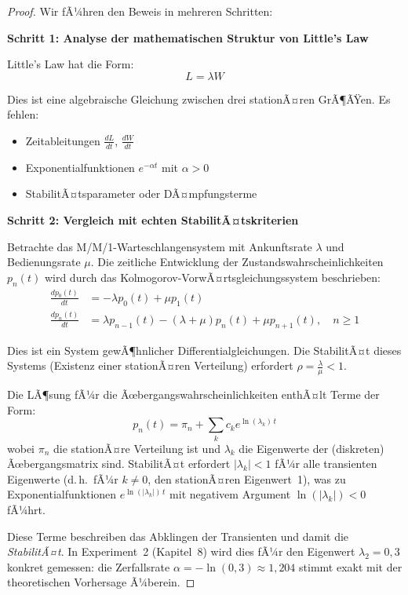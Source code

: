 ﻿\documentclass[a4paper,12pt]{scrreprt}
\theoremstyle{definition}
\begin{document}
\begin{proof}
	Wir fÃ¼hren den Beweis in mehreren Schritten:
	
	\textbf{Schritt 1: Analyse der mathematischen Struktur von Little's Law}
	
	Little's Law hat die Form:
	\begin{equation}
		L = \lambda W
	\end{equation}
	
	Dies ist eine algebraische Gleichung zwischen drei stationÃ¤ren GrÃ¶ÃŸen. Es fehlen:
	\begin{itemize}
		\item[-] Zeitableitungen $\frac{dL}{dt}$, $\frac{dW}{dt}$
		\item[-] Exponentialfunktionen $e^{-\alpha t}$ mit $\alpha > 0$
		\item[-] StabilitÃ¤tsparameter oder DÃ¤mpfungsterme
	\end{itemize}
	
	\textbf{Schritt 2: Vergleich mit echten StabilitÃ¤tskriterien}
	
	Betrachte das M/M/1-Warteschlangensystem mit Ankunftsrate $\lambda$ und Bedienungsrate $\mu$. Die zeitliche Entwicklung der Zustandswahrscheinlichkeiten $p_n(t)$ wird durch das Kolmogorov-VorwÃ¤rtsgleichungssystem beschrieben:
	\begin{align}
		\frac{dp_0(t)}{dt} &= -\lambda p_0(t) + \mu p_1(t) \\
		\frac{dp_n(t)}{dt} &= \lambda p_{n-1}(t) - (\lambda + \mu) p_n(t) + \mu p_{n+1}(t), \quad n \geq 1
	\end{align}
	
	Dies ist ein System gewÃ¶hnlicher Differentialgleichungen. Die StabilitÃ¤t dieses Systems (Existenz einer stationÃ¤ren Verteilung) erfordert $\rho = \frac{\lambda}{\mu} < 1$.
	
	Die LÃ¶sung fÃ¼r die Ãœbergangswahrscheinlichkeiten enthÃ¤lt Terme der Form:
	\begin{equation}
		p_n(t) = \pi_n + \sum_{k} c_k e^{\ln(\lambda_k)\,t}
	\end{equation}
	wobei $\pi_n$ die stationÃ¤re Verteilung ist und $\lambda_k$ die Eigenwerte
	der (diskreten) Ãœbergangsmatrix sind.  StabilitÃ¤t erfordert $|\lambda_k| < 1$
	fÃ¼r alle transienten Eigenwerte (d.\,h.\ fÃ¼r $k \neq 0$, den stationÃ¤ren
	Eigenwert~1), was zu Exponentialfunktionen $e^{\ln(|\lambda_k|)\,t}$ mit
	negativem Argument $\ln(|\lambda_k|) < 0$ fÃ¼hrt.
	
	Diese Terme beschreiben das Abklingen der Transienten und damit
	die \textit{StabilitÃ¤t}.  In Experiment~2 (Kapitel~8) wird dies fÃ¼r den
	Eigenwert $\lambda_2 = 0{,}3$ konkret gemessen: die Zerfallsrate
	$\alpha = -\ln(0{,}3) \approx 1{,}204$ stimmt exakt mit der theoretischen
	Vorhersage Ã¼berein.
	

\end{proof}
\end{document}
